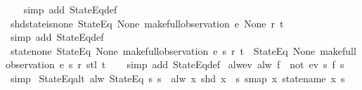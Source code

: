 \begin{isabellebody}
%
\isadelimproof
\ \ %
\endisadelimproof
%
\isatagproof
{}\isamarkupfalse%
\ {\isacharparenleft}simp\ add{\isacharcolon}\ StateEq{\isacharunderscore}def{\isacharparenright}%
\endisatagproof
{\isafoldproof}%
%
\isadelimproof
\isanewline
%
\endisadelimproof
\isanewline
{}\isamarkupfalse%
\ shd{\isacharunderscore}state{\isacharunderscore}is{\isacharunderscore}none{\isacharcolon}\ {\isachardoublequoteopen}{\isacharparenleft}StateEq\ None{\isacharparenright}\ {\isacharparenleft}make{\isacharunderscore}full{\isacharunderscore}observation\ e\ None\ r\ t{\isacharparenright}{\isachardoublequoteclose}\isanewline
%
\isadelimproof
\ \ %
\endisadelimproof
%
\isatagproof
{}\isamarkupfalse%
\ {\isacharparenleft}simp\ add{\isacharcolon}\ StateEq{\isacharunderscore}def{\isacharparenright}%
\endisatagproof
{\isafoldproof}%
%
\isadelimproof
\isanewline
%
\endisadelimproof
\isanewline
{}\isamarkupfalse%
\ state{\isacharunderscore}none{\isacharunderscore}{}{\isacharcolon}\ {\isachardoublequoteopen}{\isacharparenleft}StateEq\ None{\isacharparenright}\ {\isacharparenleft}make{\isacharunderscore}full{\isacharunderscore}observation\ e\ s\ r\ t{\isacharparenright}\ {\isasymLongrightarrow}\ {\isacharparenleft}StateEq\ None{\isacharparenright}\ {\isacharparenleft}make{\isacharunderscore}full{\isacharunderscore}observation\ e\ s\ r\ {\isacharparenleft}stl\ t{\isacharparenright}{\isacharparenright}{\isachardoublequoteclose}\isanewline
%
\isadelimproof
\ \ %
\endisadelimproof
%
\isatagproof
{}\isamarkupfalse%
\ {\isacharparenleft}simp\ add{\isacharcolon}\ StateEq{\isacharunderscore}def{\isacharparenright}%
\endisatagproof
{\isafoldproof}%
%
\isadelimproof
\isanewline
%
\endisadelimproof
\isanewline
{}\isamarkupfalse%
\ alw{\isacharunderscore}ev{\isacharcolon}\ {\isachardoublequoteopen}alw\ f\ {\isacharequal}\ not\ {\isacharparenleft}ev\ {\isacharparenleft}{\isasymlambda}s{\isachardot}\ {\isasymnot}f\ s{\isacharparenright}{\isacharparenright}{\isachardoublequoteclose}\isanewline
%
\isadelimproof
\ \ %
\endisadelimproof
%
\isatagproof
{}\isamarkupfalse%
\ simp%
\endisatagproof
{\isafoldproof}%
%
\isadelimproof
\isanewline
%
\endisadelimproof
\isanewline
{}\isamarkupfalse%
\ StateEq{\isacharunderscore}alt{\isacharcolon}\ {\isachardoublequoteopen}alw\ {\isacharparenleft}StateEq\ s{\isacharparenright}\ s{\isacharprime}\ {\isacharequal}\ alw\ {\isacharparenleft}{\isasymlambda}x{\isachardot}\ shd\ x\ {\isacharequal}\ s{\isacharparenright}\ {\isacharparenleft}smap\ {\isacharparenleft}{\isasymlambda}x{\isachardot}\ statename\ x{\isacharparenright}\ s{\isacharprime}{\isacharparenright}{\isachardoublequoteclose}\isanewline

\end{isabellebody}

